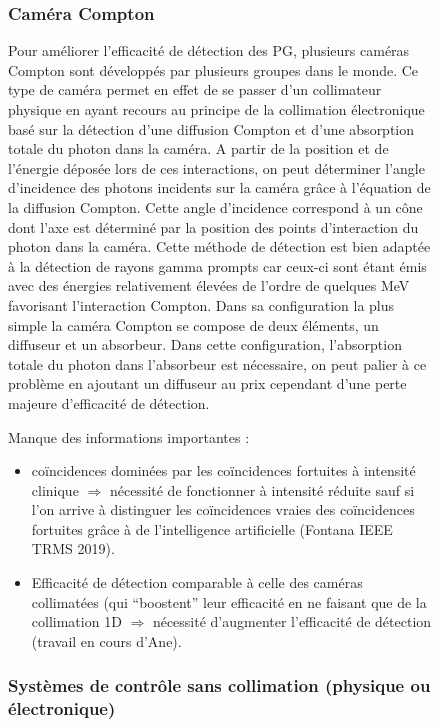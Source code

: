 \documentclass[11pt,a4paper,oldfontcommands]{memoir}
\begin{document}
\begin{figure}
\subsubsection{Caméra Compton}

Pour améliorer l'efficacité de détection des PG, plusieurs caméras Compton sont développés par plusieurs groupes dans le monde. Ce type de caméra permet en effet de se passer d'un collimateur physique en ayant recours au principe de la collimation électronique basé sur la détection d'une diffusion Compton et d'une absorption totale du photon dans la caméra. A partir de la position et de l'énergie déposée lors de ces interactions, on peut déterminer l'angle d'incidence des photons incidents sur la caméra grâce à l'équation de la diffusion Compton. Cette angle d'incidence correspond à un cône dont l'axe est déterminé par la position des points d'interaction du photon dans la caméra. Cette méthode de détection est bien adaptée à la détection de rayons gamma prompts car ceux-ci sont étant émis avec des énergies relativement élevées de l'ordre de quelques MeV favorisant l'interaction Compton. Dans sa configuration la plus simple la caméra Compton se compose de deux éléments, un diffuseur et un absorbeur. Dans cette configuration, l'absorption totale du photon dans l'absorbeur est nécessaire, on peut palier à ce problème en ajoutant un diffuseur au prix cependant d'une perte majeure d'efficacité de détection. 

Manque des informations importantes :  
\begin{itemize}
  \item coïncidences dominées par les coïncidences fortuites à intensité clinique $\Rightarrow$ nécessité de fonctionner à intensité réduite sauf si l'on arrive à distinguer les coïncidences vraies des coïncidences fortuites grâce à de l'intelligence artificielle (Fontana IEEE TRMS 2019). 
  \item Efficacité de détection comparable à celle des caméras collimatées (qui \enquote{boostent} leur efficacité en ne faisant que de la collimation 1D $\Rightarrow$ nécessité d'augmenter l'efficacité de détection (travail en cours d'Ane).
\end{itemize}




\subsubsection{Systèmes de contrôle sans collimation (physique ou électronique)}


\end{figure}
\end{document}
